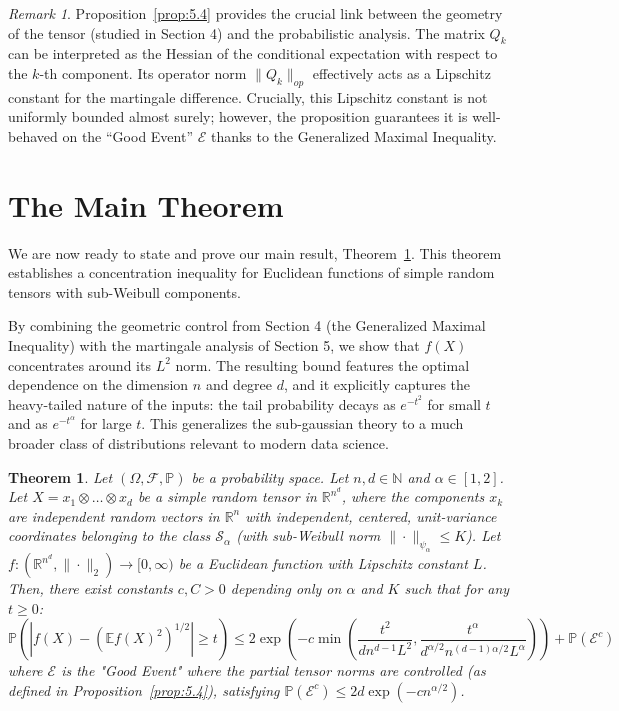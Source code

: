 \documentclass[11pt]{amsart}
\newtheorem{theorem}{Theorem}[section]
\theoremstyle{definition}
\theoremstyle{remark}
\newtheorem*{remark}{Remark}
\begin{document}
\begin{remark}
Proposition~\ref{prop:5.4} provides the crucial link between the geometry of the tensor (studied in Section 4) and the probabilistic analysis. The matrix $Q_k$ can be interpreted as the Hessian of the conditional expectation with respect to the $k$-th component. Its operator norm $\|Q_k\|_{op}$ effectively acts as a Lipschitz constant for the martingale difference. Crucially, this Lipschitz constant is not uniformly bounded almost surely; however, the proposition guarantees it is well-behaved on the ``Good Event'' $\mathcal{E}$ thanks to the Generalized Maximal Inequality.
\end{remark}

\section{The Main Theorem}

We are now ready to state and prove our main result, Theorem~\ref{thm:6.1}. This theorem establishes a concentration inequality for Euclidean functions of simple random tensors with sub-Weibull components.

By combining the geometric control from Section 4 (the Generalized Maximal Inequality) with the martingale analysis of Section 5, we show that $f(X)$ concentrates around its $L^2$ norm. The resulting bound features the optimal dependence on the dimension $n$ and degree $d$, and it explicitly captures the heavy-tailed nature of the inputs: the tail probability decays as $e^{-t^2}$ for small $t$ and as $e^{-t^\alpha}$ for large $t$. This generalizes the sub-gaussian theory to a much broader class of distributions relevant to modern data science.

\begin{theorem}\label{thm:6.1}
Let $(\Omega, \mathcal{F}, \mathbb{P})$ be a probability space. Let $n, d \in \mathbb{N}$ and $\alpha \in [1, 2]$. Let $X = x_1 \otimes \dots \otimes x_d$ be a simple random tensor in $\mathbb{R}^{n^d}$, where the components $x_k$ are independent random vectors in $\mathbb{R}^n$ with independent, centered, unit-variance coordinates belonging to the class $\mathcal{S}_{\alpha}$ (with sub-Weibull norm $\| \cdot \|_{\psi_\alpha} \le K$). Let $f: (\mathbb{R}^{n^d}, \| \cdot \|_2) \to [0, \infty)$ be a Euclidean function with Lipschitz constant $L$. Then, there exist constants $c, C > 0$ depending only on $\alpha$ and $K$ such that for any $t \ge 0$:
\begin{equation}
\mathbb{P}\left( \left| f(X) - (\mathbb{E}f(X)^2)^{1/2} \right| \ge t \right) \le 2 \exp\left( -c \min\left( \frac{t^2}{d n^{d-1} L^2}, \frac{t^\alpha}{d^{\alpha/2} n^{(d-1)\alpha/2} L^\alpha} \right) \right) + \mathbb{P}(\mathcal{E}^c)
\end{equation}
where $\mathcal{E}$ is the "Good Event" where the partial tensor norms are controlled (as defined in Proposition~\ref{prop:5.4}), satisfying $\mathbb{P}(\mathcal{E}^c) \le 2d \exp(-c n^{\alpha/2})$.
\end{theorem}
\end{document}

